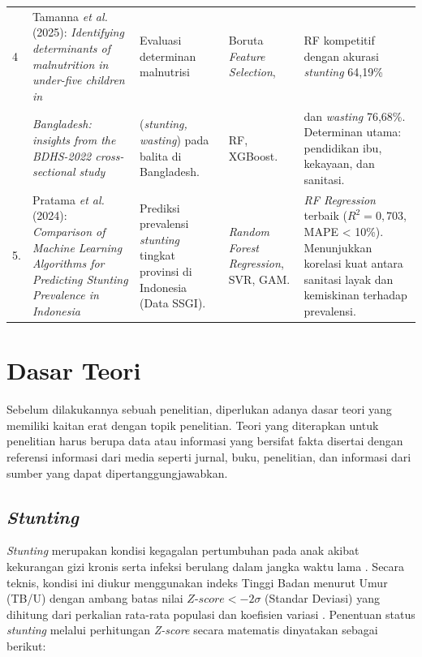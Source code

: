 \begin{longtable}{|p{}|p{}|p{}|p{}|p{}|}
    4 & Tamanna \textit{et al.} \cite{tamanna2025identifying} (2025): \textit{Identifying determinants of malnutrition in under-five children in} & Evaluasi determinan malnutrisi & Boruta \textit{Feature Selection}, & RF kompetitif dengan akurasi \textit{stunting} 64,19\% \\ 

    & \textit{Bangladesh: insights from the BDHS-2022 cross-sectional study} & (\textit{stunting, wasting}) pada balita di Bangladesh. & RF, XGBoost. & dan \textit{wasting} 76,68\%. Determinan utama: pendidikan ibu, kekayaan, dan sanitasi. \\ 
    \hline

    5. & Pratama \textit{et al.} \cite{pratama2024comparison} (2024): \textit{Comparison of Machine Learning Algorithms for Predicting Stunting Prevalence in Indonesia} & Prediksi prevalensi \textit{stunting} tingkat provinsi di Indonesia (Data SSGI). & \textit{Random Forest Regression}, SVR, GAM. & \textit{RF Regression} terbaik ($R^2=0,703$, MAPE < 10\%). Menunjukkan korelasi kuat antara sanitasi layak dan kemiskinan terhadap prevalensi. \\ 
    \hline
\end{longtable}


\section{Dasar Teori}
Sebelum dilakukannya sebuah penelitian, diperlukan adanya dasar teori yang memiliki kaitan erat dengan topik penelitian. Teori yang diterapkan untuk penelitian harus berupa data atau informasi yang bersifat fakta disertai dengan referensi informasi dari media seperti jurnal, buku, penelitian, dan informasi dari sumber yang dapat dipertanggungjawabkan.

\subsection{\textit{Stunting}}

\textit{Stunting} merupakan kondisi kegagalan pertumbuhan pada anak akibat kekurangan gizi kronis serta infeksi berulang dalam jangka waktu lama \cite{bkkbn2021ran}. Secara teknis, kondisi ini diukur menggunakan indeks Tinggi Badan menurut Umur (TB/U) dengan ambang batas nilai $\textit{Z-score} < -2\sigma$ (Standar Deviasi) yang dihitung dari perkalian rata-rata populasi dan koefisien variasi \cite{kemenkes2020standar, who2006standards}. Penentuan status \textit{stunting} melalui perhitungan \textit{Z-score} secara matematis dinyatakan sebagai berikut:

